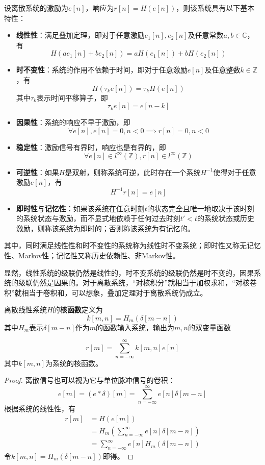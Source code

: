 \documentclass{ctexbook}
\begin{document}
\begin{definition}
    设离散系统的激励为$e[n]$，响应为$r[n]=H(e[n])$，则该系统具有以下基本特性：
    \begin{itemize}
        \item \textbf{线性性}：满足叠加定理，即对于任意激励$e_1[n],e_2[n]$及任意常数$a,b\in\mathbb{C}$，有
        \[H(ae_1[n]+be_2[n])=aH(e_1[n])+bH(e_2[n])\]
        \item \textbf{时不变性}：系统的作用不依赖于时间，即对于任意激励$e[n]$及任意整数$k\in\mathbb{Z}$，有
        \[H(\tau_k e[n])=\tau_k H(e[n])\]
        其中$\tau_k$表示时间平移算子，即
        $$\tau_k e[n]=e[n-k]$$
        \item \textbf{因果性}：系统的响应不早于激励，即
        \[\forall e[n],e[n]=0,n<0\implies r[n]=0,n<0\]
        \item \textbf{稳定性}：激励信号有界时，响应也是有界的，即
        \[\forall e[n]\in l^{\infty}(\mathbb{Z}),r[n]\in l^{\infty}(\mathbb{Z})\]
        \item \textbf{可逆性}：如果$H$是双射，则称系统可逆，此时存在一个系统$H^{-1}$使得对于任意激励$e[n]$，有
        \[H^{-1}r[n]=e[n]\]
        \item \textbf{即时性}与\textbf{记忆性}：如果该系统在任意时刻$t$的状态完全且唯一地取决于该时刻的系统状态与激励，而不显式地依赖于任何过去时刻$t'<t$的系统状态或历史激励，则称该系统为即时的；否则称该系统为有记忆的。
    \end{itemize}
    其中，同时满足线性性和时不变性的系统称为线性时不变系统；即时性又称无记忆性、Markov性；记忆性又称历史依赖性、非Markov性。
\end{definition}

显然，线性系统的级联仍然是线性的，时不变系统的级联仍然是时不变的，因果系统的级联仍然是因果的。对于离散系统，“对核积分”就相当于加权求和，“对核卷积”就相当于卷积和，可以想象，叠加定理对于离散系统仍成立。

\begin{definition}[离散线性系统的脉冲响应]
    离散线性系统$H$的\textbf{核函数}定义为
    $$k[m,n]=H_m(\delta[m-n])$$
    其中$H_m$表示$\delta[m-n]$作为$m$的函数输入系统，输出为$m,n$的双变量函数
\end{definition}

\begin{theorem}[叠加定理]
    \[r[m]=\sum_{n=-\infty}^{\infty}k[m,n]e[n]\]
    其中$k[m,n]$为系统的核函数。
\end{theorem}
\begin{proof}
    离散信号也可以视为它与单位脉冲信号的卷积：
    \[e[m]=(e*\delta)[m]=\sum_{n=-\infty}^{\infty}e[n]\delta[m-n]\]
    根据系统的线性性，有
    \begin{align*}
        r[m]&=H(e[m])\\
        &=H_m\left(\sum_{n=-\infty}^{\infty}e[n]\delta[m-n]\right)\\
        &=\sum_{n=-\infty}^{\infty}e[n]H_m(\delta[m-n])
    \end{align*}
    令$k[m,n]=H_m(\delta[m-n])$即得。
\end{proof}
\end{document}
